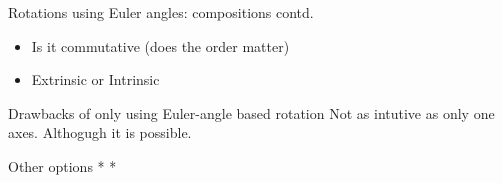 \documentclass[presentation]{beamer}
\begin{document}
\begin{frame}[label={sec:org4d49462}]{Rotations using Euler angles: compositions contd.}
\begin{itemize}
\item Is it commutative (does the order matter)
\end{itemize}
\begin{itemize}
\item Extrinsic or Intrinsic
\end{itemize}
\end{frame}
\begin{frame}[label={sec:orgbcc0b4f}]{Drawbacks of only using Euler-angle based rotation}
Not as intutive as only one axes. Althogugh it is possible.
\end{frame}
\begin{frame}[label={sec:org3fab3c2}]{Other options}
\alert{*
*}
\end{frame}
\end{document}
